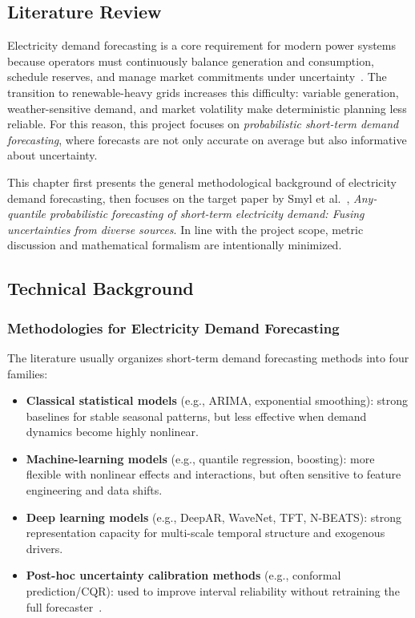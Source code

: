\begin{center}
    \chapter{Literature Review}
\end{center}
\label{chap:litreview}

\noindent
Electricity demand forecasting is a core requirement for modern power systems because operators must continuously balance generation and consumption, schedule reserves, and manage market commitments under uncertainty~\cite{hong2016probabilistic}. The transition to renewable-heavy grids increases this difficulty: variable generation, weather-sensitive demand, and market volatility make deterministic planning less reliable. For this reason, this project focuses on \emph{probabilistic short-term demand forecasting}, where forecasts are not only accurate on average but also informative about uncertainty.

\noindent
This chapter first presents the general methodological background of electricity demand forecasting, then focuses on the target paper by Smyl et al.~\cite{smyl2025anyquantile}, \emph{Any-quantile probabilistic forecasting of short-term electricity demand: Fusing uncertainties from diverse sources}. In line with the project scope, metric discussion and mathematical formalism are intentionally minimized.

\section{Technical Background}
\label{sec:techbg}

\subsection{Methodologies for Electricity Demand Forecasting}
\label{subsec:method_overview}

The literature usually organizes short-term demand forecasting methods into four families:
\begin{itemize}
    \item \textbf{Classical statistical models} (e.g., ARIMA, exponential smoothing): strong baselines for stable seasonal patterns, but less effective when demand dynamics become highly nonlinear.
    \item \textbf{Machine-learning models} (e.g., quantile regression, boosting): more flexible with nonlinear effects and interactions, but often sensitive to feature engineering and data shifts.
    \item \textbf{Deep learning models} (e.g., DeepAR, WaveNet, TFT, N-BEATS): strong representation capacity for multi-scale temporal structure and exogenous drivers.
    \item \textbf{Post-hoc uncertainty calibration methods} (e.g., conformal prediction/CQR): used to improve interval reliability without retraining the full forecaster~\cite{vovk2005,romano2019cqr}.
\end{itemize}

